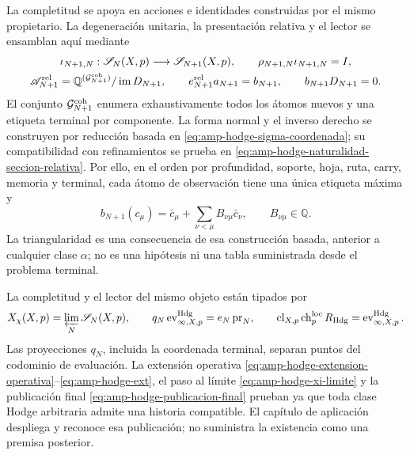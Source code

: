 La completitud se apoya en acciones e identidades construidas por el mismo
propietario. La degeneración unitaria, la presentación relativa y el lector
se ensamblan aquí mediante
\begin{equation}\label{eq:pdf2-g-coh-datos-operativos}
\begin{gathered}
 \iota_{N+1,N}:\mathscr S_N(X,p)\longrightarrow\mathscr S_{N+1}(X,p),
 \qquad \rho_{N+1,N}\iota_{N+1,N}=I,\\
 \mathscr A_{N+1}^{\rm rel}
  =\mathbb Q^{(\mathcal G_{N+1}^{\rm coh})}/\operatorname{im}D_{N+1},
 \qquad e_{N+1}^{\rm rel}a_{N+1}=b_{N+1},
 \qquad b_{N+1}D_{N+1}=0.
\end{gathered}
\end{equation}
El conjunto $\mathcal G_{N+1}^{\rm coh}$ enumera exhaustivamente todos los
átomos nuevos y una etiqueta terminal por componente. La forma normal y el
inverso derecho se construyen por reducción basada en
\eqref{eq:amp-hodge-sigma-coordenada}; su compatibilidad con refinamientos se
prueba en \eqref{eq:amp-hodge-naturalidad-seccion-relativa}. Por ello, en el
orden por profundidad, soporte, hoja, ruta, carry, memoria y terminal, cada
átomo de observación tiene una única etiqueta máxima y
\begin{equation}\label{eq:pdf2-g-coh-tabla-dato}
 b_{N+1}(c_\mu)=\bar c_\mu+
   \sum_{\nu<\mu}B_{\nu\mu}\bar c_\nu,
 \qquad B_{\nu\mu}\in\mathbb Q.
\end{equation}
La triangularidad es una consecuencia de esa construcción basada, anterior a
cualquier clase $\alpha$; no es una hipótesis ni una tabla suministrada desde
el problema terminal.

La completitud y el lector del mismo objeto están tipados por
\begin{equation}\label{eq:pdf2-g-coh-limite-lector-dato}
 X_\chi(X,p)=\varprojlim_N\mathscr S_N(X,p),
 \qquad
 q_N\operatorname{ev}^{\rm Hdg}_{\infty,X,p}
  =e_N\operatorname{pr}_N,
 \qquad
 \operatorname{cl}_{X,p}\operatorname{ch}^{\rm loc}_pR_{\rm Hdg}
  =\operatorname{ev}^{\rm Hdg}_{\infty,X,p}.
\end{equation}
Las proyecciones $q_N$, incluida la coordenada terminal, separan puntos del
codominio de evaluación. La extensión operativa
\eqref{eq:amp-hodge-extension-operativa}--\eqref{eq:amp-hodge-ext}, el paso
al límite \eqref{eq:amp-hodge-xi-limite} y la publicación final
\eqref{eq:amp-hodge-publicacion-final} prueban ya que toda clase Hodge
arbitraria admite una historia compatible. El capítulo de aplicación
despliega y reconoce esa publicación; no suministra la existencia como una
premisa posterior.


